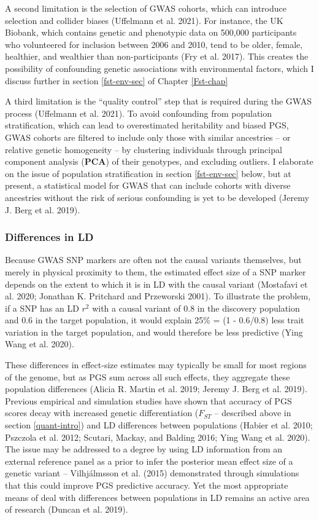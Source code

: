 \documentclass[
]{book}
\begin{document}
A second limitation is the selection of GWAS cohorts, which can introduce selection and collider biases (Uffelmann et al. 2021). For instance, the UK Biobank, which contains genetic and phenotypic data on 500,000 participants who volunteered for inclusion between 2006 and 2010, tend to be older, female, healthier, and wealthier than non-participants (Fry et al. 2017). This creates the possibility of confounding genetic associations with environmental factors, which I discuss further in section \ref{fst-env-sec} of Chapter \ref{Fst-chap}

A third limitation is the ``quality control'' step that is required during the GWAS process (Uffelmann et al. 2021). To avoid confounding from population stratification, which can lead to overestimated heritability and biased PGS, GWAS cohorts are filtered to include only those with similar ancestries -- or relative genetic homogeneity -- by clustering individuals through principal component analysis (\textbf{PCA}) of their genotypes, and excluding outliers. I elaborate on the issue of population stratification in section \ref{fst-env-sec} below, but at present, a statistical model for GWAS that can include cohorts with diverse ancestries without the risk of serious confounding is yet to be developed (Jeremy J. Berg et al. 2019).

\hypertarget{differences-in-ld}{%
\subsubsection{Differences in LD}\label{differences-in-ld}}

Because GWAS SNP markers are often not the causal variants themselves, but merely in physical proximity to them, the estimated effect size of a SNP marker depends on the extent to which it is in LD with the causal variant (Mostafavi et al. 2020; Jonathan K. Pritchard and Przeworski 2001). To illustrate the problem, if a SNP has an LD \(r^2\) with a causal variant of 0.8 in the discovery population and 0.6 in the target population, it would explain 25\% = (1 - 0.6/0.8) less trait variation in the target population, and would therefore be less predictive (Ying Wang et al. 2020).

These differences in effect-size estimates may typically be small for most regions of the genome, but as PGS sum across all such effects, they aggregate these population differences (Alicia R. Martin et al. 2019; Jeremy J. Berg et al. 2019). Previous empirical and simulation studies have shown that accuracy of PGS scores decay with increased genetic differentiation (\(F_{ST}\) -- described above in section \ref{quant-intro}) and LD differences between populations (Habier et al. 2010; Pszczola et al. 2012; Scutari, Mackay, and Balding 2016; Ying Wang et al. 2020). The issue may be addressed to a degree by using LD information from an external reference panel as a prior to infer the posterior mean effect size of a genetic variant -- Vilhjálmsson et al. (2015) demonstrated through simulations that this could improve PGS predictive accuracy. Yet the most appropriate means of deal with differences between populations in LD remains an active area of research (Duncan et al. 2019).
\end{document}
